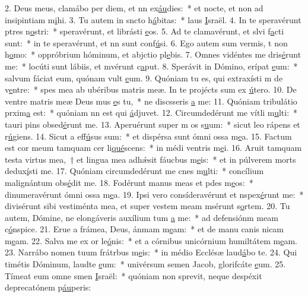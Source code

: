 2. Deus meus, clamábo per diem, et nn ex\uline{áu}dies:~* et nocte, et non ad insipintiam m\uline{i}hi.
3. Tu autem in sncto h\uline{á}bitas:~* laus \uline{I}sraël.
4. In te speravérunt ptres n\uline{o}stri:~* speravérunt, et librásti \uline{e}os.
5. Ad te clamavérunt, et slvi f\uline{a}cti sunt:~* in te speravérunt, et nn sunt conf\uline{ú}si.
6. Ego autem sum vermis, t non h\uline{o}mo:~* oppróbrium hóminum, et abjctio pl\uline{e}bis.
7. Omnes vidéntes me dris\uline{é}runt me:~* locúti sunt lábiis, et mvérunt c\uline{a}put.
8. Sperávit in Dómino, erípat \uline{e}um:~* salvum fáciat eum, quónam vult \uline{e}um.
9. Quóniam tu es, qui extraxísti m de v\uline{e}ntre:~* spes mea ab ubéribus matris meæ. In te projécts sum ex \uline{ú}tero.
10. De ventre matris meæ Deus mus \uline{e}s tu,~* ne discsseris \uline{a} me:
11. Quóniam tribulátio prxim\uline{a} est:~* quóniam nn est qui \uline{á}djuvet.
12. Circumdedérunt me vítli m\uline{u}lti:~* tauri pins obsed\uline{é}runt me.
13. Aperuérunt super m os s\uline{u}um:~* sicut leo rápens et r\uline{ú}giens.
14. Sicut a eff\uline{ú}sus sum:~* et dispérsa sunt ómni ossa m\uline{e}a.
15. Factum est cor meum tamquam cer li\uline{qué}scens:~* in médi ventris m\uline{e}i.
16. Aruit tamquam testa virtus mea,~† et lingua mea adhǽsit fáucbus m\uline{e}is:~* et in púlverem morts dedux\uline{í}sti me.
17. Quóniam circumdedérunt me cnes m\uline{u}lti:~* concílium malignántum obs\uline{é}dit me.
18. Fodérunt manus meas et pdes m\uline{e}os:~* dinumeravérunt ómni ossa m\uline{e}a.
19. Ipsi vero consíderavérunt et nspex\uline{é}runt me:~* divisérunt sibi vestiménta mea, et super vestem meam msérunt s\uline{o}rtem.
20. Tu autem, Dómine, ne elongáveris auxílium tum \uline{a} me:~* ad defensiónm meam c\uline{ó}nspice.
21. Erue a frámea, Deus, ánmam m\uline{e}am:~* et de manu canis nicam m\uline{e}am.
22. Salva me ex or le\uline{ó}nis:~* et a córnibus unicórnium humiltátem m\uline{e}am.
23. Narrábo nomen tuum frátrbus m\uline{e}is:~* in médio Ecclésæ laud\uline{á}bo te.
24. Qui timétis Dóminum, laudte \uline{e}um:~* univérsum semen Jacob, glorifcáte \uline{e}um.
25. Tímeat eum omne smen \uline{I}sraël:~* quóniam non sprevit, neque despéxit deprecatónem p\uline{áu}peris:
